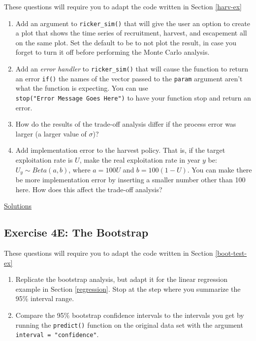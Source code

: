 \documentclass[]{book}
\providecommand{\tightlist}{%
  \setlength{\itemsep}{0pt}\setlength{\parskip}{0pt}}
\begin{document}
These questions will require you to adapt the code written in Section \ref{harv-ex}

\begin{enumerate}
\def\labelenumi{\arabic{enumi}.}
\tightlist
\item
  Add an argument to \texttt{ricker\_sim()} that will give the user an option to create a plot that shows the time series of recruitment, harvest, and escapement all on the same plot. Set the default to be to not plot the result, in case you forget to turn it off before performing the Monte Carlo analysis.
\item
  Add an \emph{error handler} to \texttt{ricker\_sim()} that will cause the function to return an error \texttt{if()} the names of the vector passed to the \texttt{param} argument aren't what the function is expecting. You can use \texttt{stop("Error\ Message\ Goes\ Here")} to have your function stop and return an error.
\item
  How do the results of the trade-off analysis differ if the process error was larger (a larger value of \(\sigma\))?
\item
  Add implementation error to the harvest policy. That is, if the target exploitation rate is \(U\), make the real exploitation rate in year \(y\) be: \(U_y \sim Beta(a,b)\), where \(a = 100U\) and \(b = 100(1-U)\). You can make there be more implementation error by inserting a smaller number other than 100 here. How does this affect the trade-off analysis?
\end{enumerate}

\protect\hyperlink{ex4d-answers}{Solutions}

\hypertarget{exercise-4e-the-bootstrap}{%
\subsection*{Exercise 4E: The Bootstrap}\label{exercise-4e-the-bootstrap}}

These questions will require you to adapt the code written in Section \ref{boot-test-ex}

\begin{enumerate}
\def\labelenumi{\arabic{enumi}.}
\tightlist
\item
  Replicate the bootstrap analysis, but adapt it for the linear regression example in Section \ref{regression}. Stop at the step where you summarize the 95\% interval range.
\item
  Compare the 95\% bootstrap confidence intervals to the intervals you get by running the \texttt{predict()} function on the original data set with the argument \texttt{interval\ =\ "confidence"}.
\end{enumerate}
\end{document}
